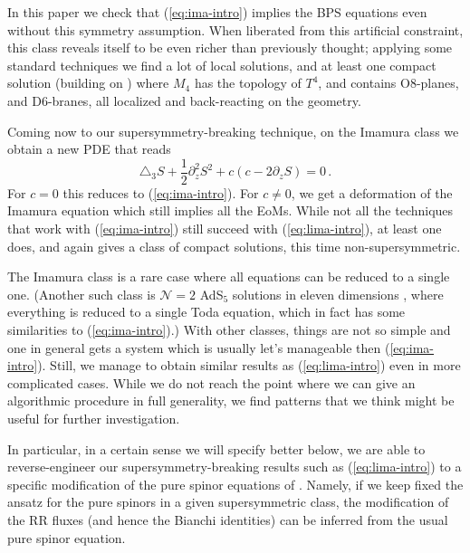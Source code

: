 \documentclass[12pt]{article}
\begin{document}
In this paper we check that (\ref{eq:ima-intro}) implies the BPS equations even without this symmetry assumption. When liberated from this artificial constraint, this class reveals itself to be even richer than previously thought; applying some standard techniques we find a lot of local solutions, and at least one compact solution (building on \cite{janssen-meessen-ortin,imamura,blaback-janssen-vanriet-vercnocke,blaback-vanderwoerd-vanriet-williams}) where $M_4$ has the topology of $T^4$, and contains O8-planes, and D6-branes, all localized and back-reacting on the geometry. 

Coming now to our supersymmetry-breaking technique, on the Imamura class we obtain a new PDE that reads
\begin{equation}\label{eq:lima-intro}
	\triangle_3 S + \frac12 \partial^2_z S^2+ c(c - 2 \partial_z S) =0\,.
\end{equation}
For $c=0$ this reduces to (\ref{eq:ima-intro}). For $c\neq 0$, we get a deformation of the Imamura equation which still implies all the EoMs. While not all the techniques that work with (\ref{eq:ima-intro}) still succeed with (\ref{eq:lima-intro}), at least one does, and again gives a class of compact solutions, this time non-supersymmetric.

The Imamura class is a rare case where all equations can be reduced to a single one. (Another such class is ${\mathcal N}=2$ AdS$_5$ solutions in eleven dimensions \cite{lin-lunin-maldacena}, where everything is reduced to a single Toda equation, which in fact has some similarities to (\ref{eq:ima-intro}).) With other classes, things are not so simple and one in general gets a system which is usually let's manageable then (\ref{eq:ima-intro}). Still, we manage to obtain similar results as (\ref{eq:lima-intro}) even in more complicated cases. While we do not reach the point where we can give an algorithmic procedure in full generality, we find patterns that we think might be useful for further investigation. 

In particular, in a certain sense we will specify better below, we are able to reverse-engineer our supersymmetry-breaking results such as (\ref{eq:lima-intro}) to a specific modification of the pure spinor equations of \cite{gmpt2}. Namely, if we keep fixed the ansatz for the pure spinors in a given supersymmetric class, the modification of the RR fluxes (and hence the Bianchi identities) can be inferred from the usual pure spinor equation. 
\end{document}
